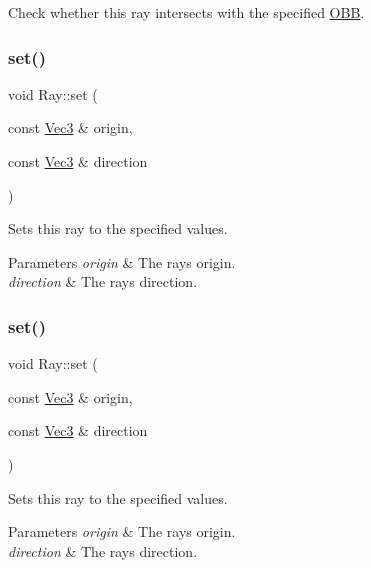 Check whether this ray intersects with the specified \hyperlink{classOBB}{O\+BB}. \mbox{\label{classRay_a7a3565df0919fbffd4cbf4cf3b71b44b}} 
\subsubsection{\texorpdfstring{set()}{set()}\hspace{0.1cm}{\footnotesize\ttfamily [1/2]}}
{\footnotesize\ttfamily void Ray\+::set (\begin{DoxyParamCaption}\item[{const \hyperlink{classVec3}{Vec3} \&}]{origin,  }\item[{const \hyperlink{classVec3}{Vec3} \&}]{direction }\end{DoxyParamCaption})}

Sets this ray to the specified values.


\begin{DoxyParams}{Parameters}
{\em origin} & The ray\textquotesingle{}s origin. \\
\hline
{\em direction} & The ray\textquotesingle{}s direction. \\
\hline
\end{DoxyParams}
\mbox{\label{classRay_a7a3565df0919fbffd4cbf4cf3b71b44b}} 
\subsubsection{\texorpdfstring{set()}{set()}\hspace{0.1cm}{\footnotesize\ttfamily [2/2]}}
{\footnotesize\ttfamily void Ray\+::set (\begin{DoxyParamCaption}\item[{const \hyperlink{classVec3}{Vec3} \&}]{origin,  }\item[{const \hyperlink{classVec3}{Vec3} \&}]{direction }\end{DoxyParamCaption})}

Sets this ray to the specified values.


\begin{DoxyParams}{Parameters}
{\em origin} & The ray\textquotesingle{}s origin. \\
\hline
{\em direction} & The ray\textquotesingle{}s direction. \\
\hline
\end{DoxyParams}
\mbox{\label{classRay_a23b3f4f7ecd94ef4ac74dba7c65fe110}} 
